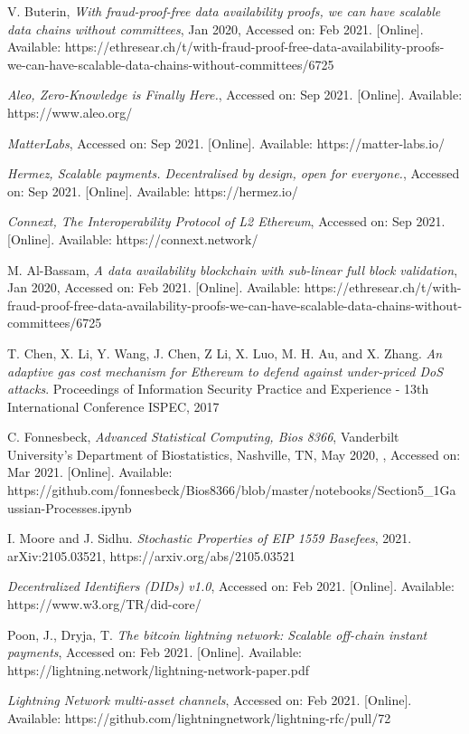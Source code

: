 \documentclass[peerreview]{ieeesyscoin}
\begin{document}
\begin{thebibliography}{00}
  V. Buterin, \textit{With fraud-proof-free data availability proofs, we can have scalable data chains without committees}, Jan 2020, Accessed on: Feb 2021.  [Online]. Available:  https://ethresear.ch/t/with-fraud-proof-free-data-availability-proofs-we-can-have-scalable-data-chains-without-committees/6725

  \textit{Aleo, Zero-Knowledge is Finally Here.}, Accessed on: Sep 2021. [Online]. Available: https://www.aleo.org/

  \textit{MatterLabs}, Accessed on: Sep 2021. [Online]. Available: https://matter-labs.io/

  \textit{Hermez, Scalable payments. Decentralised by design, open for everyone.}, Accessed on: Sep 2021. [Online]. Available: https://hermez.io/

  \textit{Connext, The Interoperability Protocol of L2 Ethereum}, Accessed on: Sep 2021. [Online]. Available: https://connext.network/

 M. Al-Bassam,\textit{ A data availability blockchain with sub-linear full block validation}, Jan 2020, Accessed on: Feb 2021.  [Online]. Available:  https://ethresear.ch/t/with-fraud-proof-free-data-availability-proofs-we-can-have-scalable-data-chains-without-committees/6725

  T. Chen, X. Li, Y. Wang, J. Chen, Z Li, X. Luo, M. H. Au, and X. Zhang. \textit{An adaptive gas cost mechanism for Ethereum to defend against under-priced DoS attacks}. Proceedings of Information Security Practice and Experience - 13th International Conference ISPEC, 2017

 C. Fonnesbeck, \textit{Advanced Statistical Computing, Bios 8366}, Vanderbilt University's Department of Biostatistics, Nashville, TN, May 2020, , Accessed on: Mar 2021.  [Online]. Available:  https://github.com/fonnesbeck/Bios8366/blob/master/notebooks/Section5\_1\-Gaussian-Processes.ipynb

  I. Moore and J. Sidhu. \textit{Stochastic Properties of EIP 1559 Basefees}, 2021. arXiv:2105.03521,  https://arxiv.org/abs/2105.03521

  \textit{Decentralized Identifiers (DIDs) v1.0}, Accessed on: Feb 2021. [Online]. Available: https://www.w3.org/TR/did-core/

  Poon, J., Dryja, T. \textit{The bitcoin lightning network: Scalable off-chain instant payments}, Accessed on: Feb 2021. [Online]. Available: https://lightning.network/lightning-network-paper.pdf

  \textit{Lightning Network multi-asset channels}, Accessed on: Feb 2021. [Online]. Available: https://github.com/lightningnetwork/lightning-rfc/pull/72






\end{thebibliography}


\EOD
\end{document}
